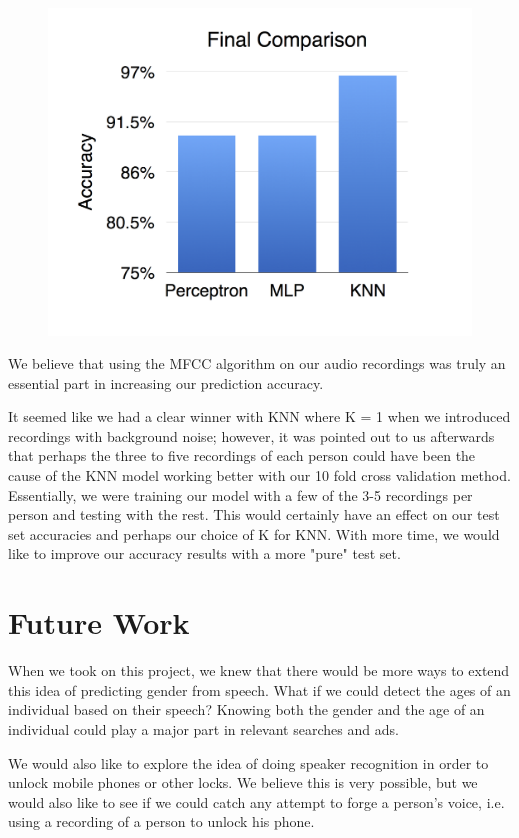 \documentclass{article}
\begin{document}
\begin{figure}[h]
\includegraphics[width=\linewidth]{final_comparison}
\end{figure}

We believe that using the MFCC algorithm on our audio recordings was truly an essential part in increasing our prediction accuracy.

It seemed like we had a clear winner with KNN where K = 1 when we introduced recordings with background noise; however, it was pointed out to us afterwards that perhaps the three to five recordings of each person could have been the cause of the KNN model working better with our 10 fold cross validation method. Essentially, we were training our model with a few of the 3-5 recordings per person and testing with the rest. This would certainly have an effect on our test set accuracies and perhaps our choice of K for KNN. With more time, we would like to improve our accuracy results with a more "pure" test set.

\section{Future Work}

When we took on this project, we knew that there would be more ways to extend this idea of predicting gender from speech. What if we could detect the ages of an individual based on their speech? Knowing both the gender and the age of an individual could play a major part in relevant searches and ads.

We would also like to explore the idea of doing speaker recognition in order to unlock mobile phones or other locks. We believe this is very possible, but we would also like to see if we could catch any attempt to forge a person's voice, i.e. using a recording of a person to unlock his phone.
\end{document}
